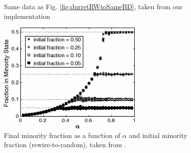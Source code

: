 \documentclass[11pt]{article}
\begin{document}
\begin{figure}[h!]
  \centering
  \hspace{3mm}
  \caption{Same data as Fig. \ref{fig:durretRWtoSameBD}, taken from our implementation}
  \label{fig:myRWtoSameBD}
\end{figure}

\begin{figure}[h!]
  \centering
  \includegraphics[height=55mm]{rwToRandomBifDiag}
  \caption{Final minority fraction as a function of $\alpha$ and initial minority fraction (rewire-to-random), taken from \cite{durret:pnas12}.}
  \label{fig:durretRWtoRandomBD}
\end{figure}
\end{document}
